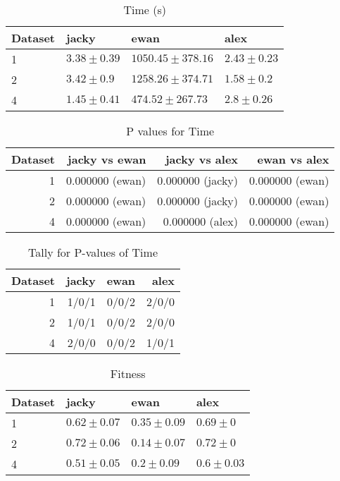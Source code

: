 \documentclass{article}
\begin{document}
\begin{table}
\centering
\begin{tabular}{llll}
  \hline
Dataset & jacky & ewan & alex \\ 
  \hline
1 & $3.38 \pm 0.39$ & $1050.45 \pm 378.16$ & $2.43 \pm 0.23$ \\ 
  2 & $3.42 \pm 0.9$ & $1258.26 \pm 374.71$ & $1.58 \pm 0.2$ \\ 
  4 & $1.45 \pm 0.41$ & $474.52 \pm 267.73$ & $2.8 \pm 0.26$ \\ 
   \hline
\end{tabular}
\caption{Time (s)} 
\end{table}
\begin{table}
\centering
\begin{tabular}{rrrr}
  \hline
Dataset & jacky vs ewan & jacky vs alex & ewan vs alex \\ 
  \hline
1 & 0.000000 (ewan) & 0.000000 (jacky) & 0.000000 (ewan) \\ 
  2 & 0.000000 (ewan) & 0.000000 (jacky) & 0.000000 (ewan) \\ 
  4 & 0.000000 (ewan) & 0.000000 (alex) & 0.000000 (ewan) \\ 
   \hline
\end{tabular}
\caption{P values for Time} 
\end{table}
\begin{table}
\centering
\begin{tabular}{rrrr}
  \hline
Dataset & jacky & ewan & alex \\ 
  \hline
1 & 1/0/1 & 0/0/2 & 2/0/0 \\ 
  2 & 1/0/1 & 0/0/2 & 2/0/0 \\ 
  4 & 2/0/0 & 0/0/2 & 1/0/1 \\ 
   \hline
\end{tabular}
\caption{Tally for P-values of Time} 
\end{table}
\begin{table}
\centering
\begin{tabular}{llll}
  \hline
Dataset & jacky & ewan & alex \\ 
  \hline
1 & $0.62 \pm 0.07$ & $0.35 \pm 0.09$ & $0.69 \pm 0$ \\ 
  2 & $0.72 \pm 0.06$ & $0.14 \pm 0.07$ & $0.72 \pm 0$ \\ 
  4 & $0.51 \pm 0.05$ & $0.2 \pm 0.09$ & $0.6 \pm 0.03$ \\ 
   \hline
\end{tabular}
\caption{Fitness} 
\end{table}
\end{document}
